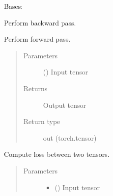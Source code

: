 \documentclass[letterpaper,10pt,english]{sphinxmanual}
\begin{document}
\begin{fulllineitems}
\label{\detokenize{nn:nn.sequential.Sequential}}
Bases: {\hyperref[\detokenize{nn:nn.module.Module}]{}}

\begin{fulllineitems}
\label{\detokenize{nn:nn.sequential.Sequential.backward}}
Perform backward pass.

\end{fulllineitems}


\begin{fulllineitems}
\label{\detokenize{nn:nn.sequential.Sequential.forward}}
Perform forward pass.
\begin{quote}\begin{description}
\item[{Parameters}] \leavevmode
{} () \textendash{} Input tensor

\item[{Returns}] \leavevmode
Output tensor

\item[{Return type}] \leavevmode
out (torch.tensor)

\end{description}\end{quote}

\end{fulllineitems}


\begin{fulllineitems}
\label{\detokenize{nn:nn.sequential.Sequential.loss}}
Compute loss between two tensors.
\begin{quote}\begin{description}
\item[{Parameters}] \leavevmode\begin{itemize}
\item {} 
 () \textendash{} Input tensor


\end{itemize}
\end{description}
\end{quote}
\end{fulllineitems}
\end{fulllineitems}
\end{document}
